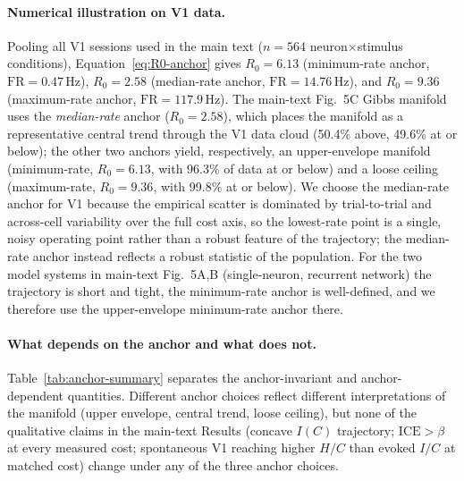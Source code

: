 \documentclass[11pt]{article}
\theoremstyle{remark}
\theoremstyle{definition}
\begin{document}
\paragraph{Numerical illustration on V1 data.}
Pooling all V1 sessions used in the main text ($n=564$ neuron$\times$stimulus conditions), Equation~\eqref{eq:R0-anchor} gives $R_0 = 6.13$ (minimum-rate anchor, $\mathrm{FR}=0.47$\,Hz), $R_0=2.58$ (median-rate anchor, $\mathrm{FR}=14.76$\,Hz), and $R_0=9.36$ (maximum-rate anchor, $\mathrm{FR}=117.9$\,Hz).  The main-text Fig.~5C Gibbs manifold uses the \emph{median-rate} anchor ($R_0=2.58$), which places the manifold as a representative central trend through the V1 data cloud (50.4\% above, 49.6\% at or below); the other two anchors yield, respectively, an upper-envelope manifold (minimum-rate, $R_0=6.13$, with 96.3\% of data at or below) and a loose ceiling (maximum-rate, $R_0=9.36$, with 99.8\% at or below).  We choose the median-rate anchor for V1 because the empirical scatter is dominated by trial-to-trial and across-cell variability over the full cost axis, so the lowest-rate point is a single, noisy operating point rather than a robust feature of the trajectory; the median-rate anchor instead reflects a robust statistic of the population.  For the two model systems in main-text Fig.~5A,B (single-neuron, recurrent network) the trajectory is short and tight, the minimum-rate anchor is well-defined, and we therefore use the upper-envelope minimum-rate anchor there.

\paragraph{What depends on the anchor and what does not.}
Table~\ref{tab:anchor-summary} separates the anchor-invariant and anchor-dependent quantities.  Different anchor choices reflect different interpretations of the manifold (upper envelope, central trend, loose ceiling), but none of the qualitative claims in the main-text Results (concave $I(C)$ trajectory; $\mathrm{ICE}>\beta$ at every measured cost; spontaneous V1 reaching higher $H/C$ than evoked $I/C$ at matched cost) change under any of the three anchor choices.
\end{document}
